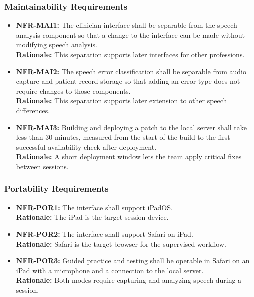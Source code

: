 \documentclass[12pt]{article}
\begin{document}
    \subsubsection{Maintainability Requirements}
    \begin{itemize}
        \item \textbf{NFR-MAI1:} The clinician interface shall be separable from the speech analysis component so that a change to the interface can be made without modifying speech analysis. \\
        \textbf{Rationale:} This separation supports later interfaces for other professions.
        \item \textbf{NFR-MAI2:} The speech error classification shall be separable from audio capture and patient-record storage so that adding an error type does not require changes to those components. \\
        \textbf{Rationale:} This separation supports later extension to other speech differences.
        \item \textbf{NFR-MAI3:} Building and deploying a patch to the local server shall take less than 30 minutes, measured from the start of the build to the first successful availability check after deployment. \\
        \textbf{Rationale:} A short deployment window lets the team apply critical fixes between sessions.
    \end{itemize}

    \subsubsection{Portability Requirements}
    \begin{itemize}
        \item \textbf{NFR-POR1:} The interface shall support iPadOS. \\
        \textbf{Rationale:} The iPad is the target session device.
        \item \textbf{NFR-POR2:} The interface shall support Safari on iPad. \\
        \textbf{Rationale:} Safari is the target browser for the supervised workflow.
        \item \textbf{NFR-POR3:} Guided practice and testing shall be operable in Safari on an iPad with a microphone and a connection to the local server. \\
        \textbf{Rationale:} Both modes require capturing and analyzing speech during a session.

    \end{itemize}
\end{document}
